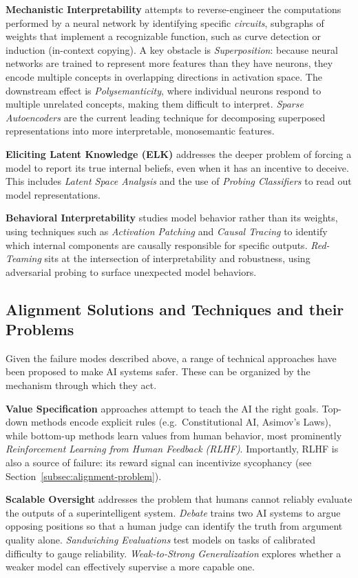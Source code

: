 \textbf{Mechanistic Interpretability} attempts to reverse-engineer the
computations performed by a neural network by identifying specific
\textit{circuits}, subgraphs of weights that implement a recognizable function, such as curve detection or induction (in-context copying). A key obstacle is \textit{Superposition}: because neural networks are trained to represent more features than they have neurons, they encode multiple concepts in overlapping directions in activation space. The downstream effect is \textit{Polysemanticity}, where individual neurons respond to multiple unrelated concepts, making them difficult to interpret. \textit{Sparse Autoencoders} are the current leading technique for decomposing superposed representations into more interpretable, monosemantic features.

\textbf{Eliciting Latent Knowledge (ELK)} addresses the deeper problem of
forcing a model to report its true internal beliefs, even when it has an
incentive to deceive. This includes \textit{Latent Space Analysis} and the use of \textit{Probing Classifiers} to read out model representations.

\textbf{Behavioral Interpretability} studies model behavior rather than its weights, using techniques such as \textit{Activation Patching} and
\textit{Causal Tracing} to identify which internal components are causally responsible for specific outputs. \textit{Red-Teaming} sits at the intersection of interpretability and robustness, using adversarial probing to surface unexpected model behaviors.


\subsection{Alignment Solutions and Techniques and their Problems}
\label{subsec:solutions}

Given the failure modes described above, a range of technical approaches have been proposed to make AI systems safer. These can be organized by the mechanism through which they act.

\textbf{Value Specification} approaches attempt to teach the AI the right
goals. Top-down methods encode explicit rules (e.g.\ Constitutional AI,
Asimov's Laws), while bottom-up methods learn values from human behavior, most prominently \textit{Reinforcement Learning from Human Feedback (RLHF)}. Importantly, RLHF is also a source of failure: its reward signal can incentivize sycophancy (see Section~\ref{subsec:alignment-problem}).

\textbf{Scalable Oversight} addresses the problem that humans cannot reliably evaluate the outputs of a superintelligent system. \textit{Debate} trains two AI systems to argue opposing positions so that a human judge can identify the truth from argument quality alone. \textit{Sandwiching Evaluations} test models on tasks of calibrated difficulty to gauge reliability. \textit{Weak-to-Strong Generalization} explores whether a weaker model can effectively supervise a more capable one.

